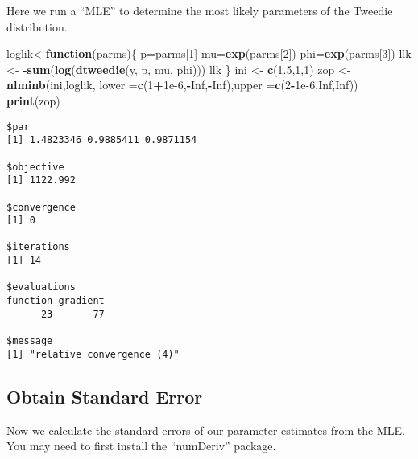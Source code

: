 \documentclass[]{book}
\newenvironment{Shaded}{\begin{snugshade}}{\end{snugshade}}
\newcommand{\KeywordTok}[1]{\textcolor[rgb]{0.13,0.29,0.53}{\textbf{#1}}}
\newcommand{\DataTypeTok}[1]{\textcolor[rgb]{0.13,0.29,0.53}{#1}}
\newcommand{\DecValTok}[1]{\textcolor[rgb]{0.00,0.00,0.81}{#1}}
\newcommand{\FloatTok}[1]{\textcolor[rgb]{0.00,0.00,0.81}{#1}}
\newcommand{\StringTok}[1]{\textcolor[rgb]{0.31,0.60,0.02}{#1}}
\newcommand{\OtherTok}[1]{\textcolor[rgb]{0.56,0.35,0.01}{#1}}
\newcommand{\ControlFlowTok}[1]{\textcolor[rgb]{0.13,0.29,0.53}{\textbf{#1}}}
\newcommand{\OperatorTok}[1]{\textcolor[rgb]{0.81,0.36,0.00}{\textbf{#1}}}
\newcommand{\NormalTok}[1]{#1}
\theoremstyle{definition}
\theoremstyle{definition}
\theoremstyle{definition}
\theoremstyle{remark}
\begin{document}
Here we run a ``MLE'' to determine the most likely parameters of the
Tweedie distribution.

\begin{Shaded}
\begin{Highlighting}[]
\NormalTok{loglik<-}\ControlFlowTok{function}\NormalTok{(parms)\{ }
\NormalTok{  p=parms[}\DecValTok{1}\NormalTok{]}
\NormalTok{  mu=}\KeywordTok{exp}\NormalTok{(parms[}\DecValTok{2}\NormalTok{])}
\NormalTok{  phi=}\KeywordTok{exp}\NormalTok{(parms[}\DecValTok{3}\NormalTok{])}
\NormalTok{  llk <-}\StringTok{ }\OperatorTok{-}\KeywordTok{sum}\NormalTok{(}\KeywordTok{log}\NormalTok{(}\KeywordTok{dtweedie}\NormalTok{(y, p, mu, phi)))}
\NormalTok{  llk}
\NormalTok{\}}
\NormalTok{ini <-}\StringTok{ }\KeywordTok{c}\NormalTok{(}\FloatTok{1.5}\NormalTok{,}\DecValTok{1}\NormalTok{,}\DecValTok{1}\NormalTok{)}
\NormalTok{zop <-}\StringTok{ }\KeywordTok{nlminb}\NormalTok{(ini,loglik, }\DataTypeTok{lower =}\KeywordTok{c}\NormalTok{(}\DecValTok{1}\OperatorTok{+}\FloatTok{1e-6}\NormalTok{,}\OperatorTok{-}\OtherTok{Inf}\NormalTok{,}\OperatorTok{-}\OtherTok{Inf}\NormalTok{),}\DataTypeTok{upper =}\KeywordTok{c}\NormalTok{(}\DecValTok{2}\OperatorTok{-}\FloatTok{1e-6}\NormalTok{,}\OtherTok{Inf}\NormalTok{,}\OtherTok{Inf}\NormalTok{))}
\KeywordTok{print}\NormalTok{(zop)}
\end{Highlighting}
\end{Shaded}

\begin{verbatim}
$par
[1] 1.4823346 0.9885411 0.9871154

$objective
[1] 1122.992

$convergence
[1] 0

$iterations
[1] 14

$evaluations
function gradient 
      23       77 

$message
[1] "relative convergence (4)"
\end{verbatim}

\subsection{Obtain Standard Error}\label{obtain-standard-error-4}

Now we calculate the standard errors of our parameter estimates from the
MLE. You may need to first install the ``numDeriv'' package.

\begin{Shaded}
\end{Shaded}
\end{document}
